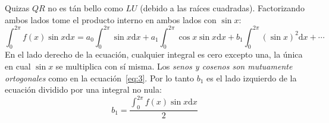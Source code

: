 \documentclass[a4paper]{memoir}
\begin{document}
Quizas $QR$ no es tán bello como $LU$ (debido a las raíces cuadradas). Factorizando ambos lados tome el producto interno en ambos lados con $\sin x$:
\begin{equation}
  \int_0^{2\pi}f(x)\sin x\mathrm{d}x=a_0\int_0^{2\pi}\sin x\mathrm{d}x+a_1\int_0^{2\pi}\cos x\sin x\mathrm{d}x+ b_1\int_0^{2\pi}{(\sin x)}^2\mathrm{d}x+\cdots
\end{equation}
En el lado derecho de la ecuación, cualquier integral es cero excepto una, la única en cual $\sin x$ se multiplica con sí misma. Los \emph{senos y cosenos son mutuamente ortogonales} como en la ecuación~\ref{eq:3}. Por lo tanto $b_1$ es el lado izquierdo de la ecuación dividido por una integral no nula:
\begin{equation}
  b_1=\frac{\int_{0}^{2\pi}f(x)\sin x\mathrm{d}x}{2}
\end{equation}
\end{document}
